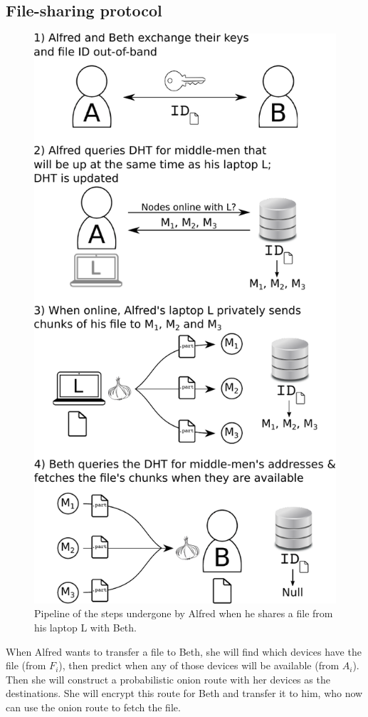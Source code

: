 \subsection{File-sharing protocol}
\label{FileSharingProtocol}

\begin{figure}[t]
\centering
\includegraphics[width=0.8\columnwidth]{figures/schema.pdf}
\caption{\label{fig:pipeline}Pipeline of the steps undergone by Alfred when he shares a file from his laptop L with Beth.}
\end{figure}

When Alfred wants to transfer a file to Beth, she will find which devices have the 
file (from \(F_i\)), then predict when any of those devices will be available 
(from \(A_i\)).
Then she will construct a probabilistic onion route with her devices as the 
destinations.
She will encrypt this route for Beth and transfer it to him, who now can use the 
onion route to fetch the file.
